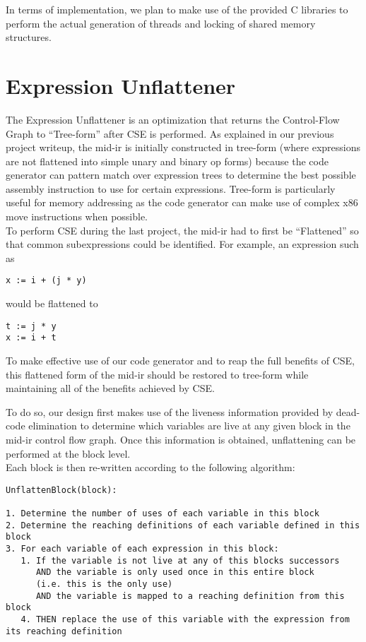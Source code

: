 \documentclass[11pt]{article}
\begin{document}
In terms of implementation, we plan to make use of the provided C
libraries to perform the actual generation of threads and locking of
shared memory structures.  

\section {Expression Unflattener}
\label{sec:unflatten}

The Expression Unflattener is an optimization that returns the
Control-Flow Graph to ``Tree-form'' after CSE is performed. As
explained in our previous project writeup, the mid-ir is initially constructed
in tree-form (where expressions are not flattened into simple unary
and binary op forms) because the code generator can pattern match over
expression trees to determine the best possible assembly
instruction to use for certain expressions. Tree-form is particularly
useful for memory addressing as the code generator can make use of
complex x86 move instructions when possible.\\

To perform CSE during the last project, the mid-ir had to first be
``Flattened'' so that common subexpressions could be identified. For
example, an expression such as 

\begin{verbatim}
x := i + (j * y)
\end{verbatim} 

\noindent would be flattened to 

\begin{verbatim}
t := j * y 
x := i + t
\end{verbatim}

To make effective use of our code generator and to reap the full
benefits of CSE, this flattened form of the mid-ir should be restored
to tree-form while maintaining all of the benefits achieved by CSE. 

To do so, our design first makes use of the liveness information
provided by dead-code elimination to determine which variables are
live at any given block in the mid-ir control flow graph. Once this
information is obtained, unflattening can be performed at the block
level.\\


\noindent Each block is then re-written according to the following algorithm: 

\begin{verbatim}
UnflattenBlock(block):

1. Determine the number of uses of each variable in this block 
2. Determine the reaching definitions of each variable defined in this
block
3. For each variable of each expression in this block: 
   1. If the variable is not live at any of this blocks successors 
      AND the variable is only used once in this entire block 
      (i.e. this is the only use)
      AND the variable is mapped to a reaching definition from this block 
   4. THEN replace the use of this variable with the expression from
its reaching definition
\end{verbatim}
\end{document}
